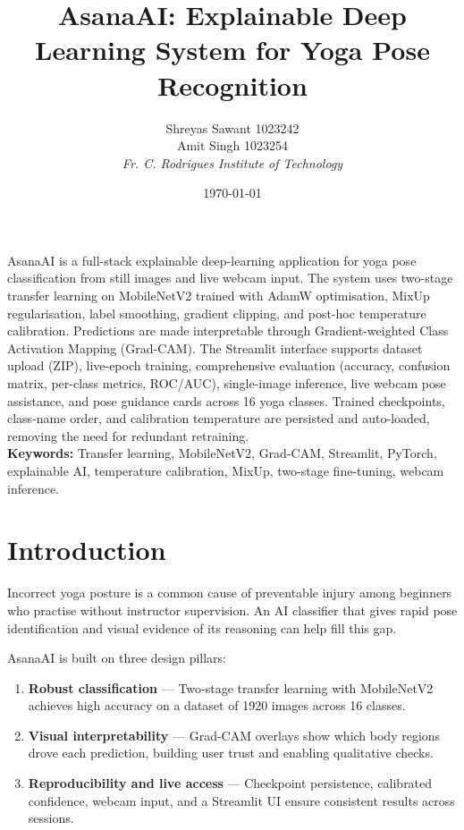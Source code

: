 \documentclass[12pt,a4paper]{article}
\title{\textbf{AsanaAI: Explainable Deep Learning System for Yoga Pose Recognition}}
\author{Shreyas Sawant 1023242 \\ Amit Singh 1023254 \\
\textit{Fr. C. Rodrigues Institute of Technology}}
\date{\today}
\begin{document}
\maketitle

\begin{tcolorbox}[colback=primary!6, colframe=primary,
  title=\bfseries Abstract, fonttitle=\small, boxrule=0.8pt, arc=4pt]
\small{}
AsanaAI is a full-stack explainable deep-learning application for yoga pose classification
from still images and live webcam input. The system uses two-stage transfer learning on
MobileNetV2 trained with AdamW optimisation, MixUp regularisation, label smoothing,
gradient clipping, and post-hoc temperature calibration. Predictions are made interpretable
through Gradient-weighted Class Activation Mapping (Grad-CAM). The Streamlit interface
supports dataset upload (ZIP), live-epoch training, comprehensive evaluation (accuracy,
confusion matrix, per-class metrics, ROC/AUC), single-image inference, live webcam
pose assistance, and pose guidance cards across 16 yoga classes. Trained checkpoints,
class-name order, and calibration temperature are persisted and auto-loaded, removing
the need for redundant retraining.\\[3pt]
\textbf{Keywords:} Transfer learning, MobileNetV2, Grad-CAM, Streamlit, PyTorch,
explainable AI, temperature calibration, MixUp, two-stage fine-tuning, webcam inference.
\end{tcolorbox}

\newpage
{\small\tableofcontents}
\newpage

\section{Introduction}

Incorrect yoga posture is a common cause of preventable injury among beginners who
practise without instructor supervision. An AI classifier that gives rapid pose
identification and visual evidence of its reasoning can help fill this gap.

AsanaAI is built on three design pillars:
\begin{enumerate}[leftmargin=1.5em, label=\textbf{\arabic*.}, itemsep=1pt]
  \item \textbf{Robust classification} — Two-stage transfer learning with MobileNetV2
    achieves high accuracy on a dataset of 1920 images across 16 classes.
  \item \textbf{Visual interpretability} — Grad-CAM overlays show which body regions
    drove each prediction, building user trust and enabling qualitative checks.
  \item \textbf{Reproducibility and live access} — Checkpoint persistence, calibrated
    confidence, webcam input, and a Streamlit UI ensure consistent results across sessions.
\end{enumerate}
\end{document}
